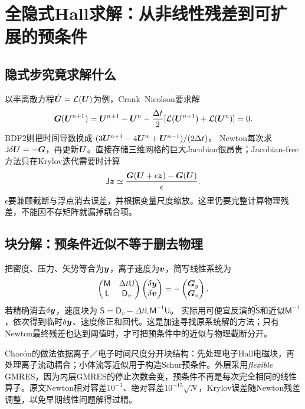 \documentclass[UTF8,a4paper,11pt,openany,fontset=fandol]{ctexbook}
\begin{document}
\section{全隐式Hall求解：从非线性残差到可扩展的预条件}
\subsection{隐式步究竟求解什么}
以半离散方程$\dot{\bm{U}}=\mathcal L(\bm{U})$为例，Crank--Nicolson要求解
\begin{equation}
 \bm{G}(\bm{U}^{n+1})=\bm{U}^{n+1}-\bm{U}^n
 -\frac{\Delta t}{2}[\mathcal L(\bm{U}^{n+1})+\mathcal L(\bm{U}^n)]=0.
\end{equation}
BDF2则把时间导数换成
$(3\bm{U}^{n+1}-4\bm{U}^n+\bm{U}^{n-1})/(2\Delta t)$。
Newton每次求$\mathsf J\delta\bm{U}=-\bm{G}$，再更新$\bm{U}$。直接存储三维网格的巨大Jacobian很昂贵；Jacobian-free方法只在Krylov迭代需要时计算
\begin{equation}
 \mathsf J\bm{z}\simeq
 \frac{\bm{G}(\bm{U}+\epsilon\bm{z})-\bm{G}(\bm{U})}{\epsilon}.
\end{equation}
$\epsilon$要兼顾截断与浮点消去误差，并根据变量尺度缩放。这里仍要完整计算物理残差，不能因不存矩阵就漏掉耦合项。\citep{L296}

\subsection{块分解：预条件近似不等于删去物理}
把密度、压力、矢势等合为$\bm{y}$，离子速度为$\bm{v}$，简写线性系统为
\begin{equation}
 \begin{pmatrix}\mathsf M&\Delta t\mathsf U\\
 \mathsf L&\mathsf D_v\end{pmatrix}
 \begin{pmatrix}\delta\bm{y}\\\delta\bm{v}\end{pmatrix}
 =-\begin{pmatrix}\bm{G}_y\\\bm{G}_v\end{pmatrix}.
\end{equation}
若精确消去$\delta\bm{y}$，速度块为
$\mathsf S=\mathsf D_v-\Delta t\mathsf L\mathsf M^{-1}\mathsf U$。
实际用可便宜反演的$\widetilde{\mathsf S}$和近似$\mathsf M^{-1}$，依次得到临时$\delta\bm{y}$、速度修正和回代。这是加速寻找原系统解的方法；只有Newton最终残差也达到阈值时，才可把预条件中的近似与物理截断分开。

Chacón的做法依据离子／电子时间尺度分开块结构：先处理电子Hall电磁块，再处理离子流动耦合；小体流等近似用于构造Schur预条件。外层采用\emph{flexible} GMRES，因为内层GMRES的停止次数会变，预条件不再是每次完全相同的线性算子。原文Newton相对容差$10^{-3}$、绝对容差$10^{-15}\sqrt N$，Krylov误差随Newton残差调整，以免早期线性问题解得过精。
\end{document}
